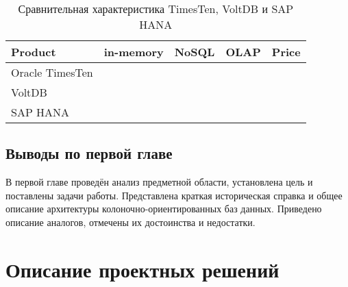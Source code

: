 \documentclass{matmex-diploma}
\begin{document}
    \begin{table}[h]
        \centering
        \caption{Сравнительная характеристика TimesTen, VoltDB и SAP HANA}
        \begin{tabular}{| l | c | c | c | c |}
            \hline
            Product & in-memory & NoSQL & OLAP & Price \\
            \hline
            Oracle TimesTen & \color{green}{\checkmark} & \color{green}{\checkmark} & \color{green}{\checkmark} & \color{red}{€19,969.00} \\
            \hline 
            VoltDB          & \color{green}{\checkmark} & \color{green}{\checkmark} & \color{green}{\checkmark} & \color{red}{\$3500/month} \\
            \hline
            SAP HANA        & \color{green}{\checkmark} & \color{green}{\checkmark} & \color{green}{\checkmark} & \color{red}{\$3595/month}\\
            \hline
        \end{tabular}
    \end{table}
    
    \subsection{Выводы по первой главе}
        В первой главе проведён анализ предметной области, установлена цель и поставлены задачи работы. Представлена краткая историческая справка и общее описание архитектуры колоночно-ориентированных баз данных. Приведено описание аналогов, отмечены их достоинства и недостатки.
    
\section{Описание проектных решений}
\end{document}

